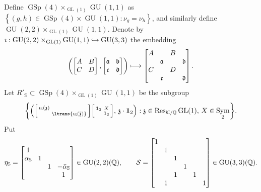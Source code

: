 \documentclass[JEP,XML,SOM,Unicode,published]{cedram}
\newenvironment{Smallbmatrix}{\Big[\begin{smallmatrix}}{\end{smallmatrix}\Big]}
\newcommand\mto{\mathchoice{\longmapsto}{\mapsto}{\mapsto}{\mapsto}}
\newcommand\hto{\mathrel{\lhook\joinrel\to}}
\theoremstyle{plain}
\theoremstyle{remark}
\let\mr\mathrm
\newcommand{\bQ}{\mathbb{Q}}
\newcommand{\bS}{\mathbb{S}}
\newcommand{\cK}{\mathcal{K}}
\newcommand{\cS}{\mathcal{S}}
\newcommand{\fa}{\mathfrak{a}}
\newcommand{\fb}{\mathfrak{b}}
\newcommand{\fc}{\mathfrak{c}}
\newcommand{\fd}{\mathfrak{d}}
\newcommand{\fz}{\mathfrak{z}}
\DeclareMathOperator{\GL}{GL}
\DeclareMathOperator{\GSp}{GSp}
\DeclareMathOperator{\GU}{GU}
\DeclareMathOperator{\Sym}{Sym}
\newcommand{\bid}{\mathbf{1}}
\newcommand{\alphaS}{\alpha_{\mathbb{S}}}
\newcommand{\alphabS}{\bar{\alpha}_{\mathbb{S}}}
\begin{document}
Define $\GSp(4)\times_{\GL(1)}\GU(1,1)$ as $\left\{(g,h)\in \GSp(4)\times\GU(1,1):\nu_g=\nu_h\right\}$, and similarly define $\GU(2,2)\times_{\GL(1)}\GU(1,1)$. Denote by $\imath:\GU(2,2)\times_{\GL(1)}\GU(1,1)\hto\GU(3,3)$ the embedding
\[\arraycolsep4.5pt
\left(\begin{bmatrix}A&B\\C&D\end{bmatrix},\begin{bmatrix}\fa&\fb\\\fc&\fd\end{bmatrix}\right)\mto
\begin{bmatrix}A&&B\\&\fa&&\fb\\C&&D\\&\fc&&\fd\end{bmatrix}.
\]
Let $R'_\bS \subset \GSp(4)\times_{\GL(1)}\GU(1,1)$ be the subgroup
\[
\biggl\{\left(\begin{Smallbmatrix}\imath_\bS(\fz)\\&\ltrans{\imath_\bS(\bar{\fz})}\end{Smallbmatrix}\begin{Smallbmatrix}\bid_2&X\\&\bid_2\end{Smallbmatrix},\,\fz\cdot\bid_2\right):\fz\in \mr{Res}_{\cK/\bQ}\GL(1),\,X\in\Sym_2\biggr\}.
\]
Put
\[\arraycolsep4.5pt
\eta_\bS=\begin{bmatrix}
1\\ \alphaS&1\\&&1&-\alphabS\\&&&1
\end{bmatrix}\in\GU(2,2)(\bQ),
\qquad\cS=\begin{bmatrix}1\\&1\\&&1\\&&&1\\&&1&&1\\&1&&&&1\end{bmatrix}\in\GU(3,3)(\bQ).
\]
\end{document}
